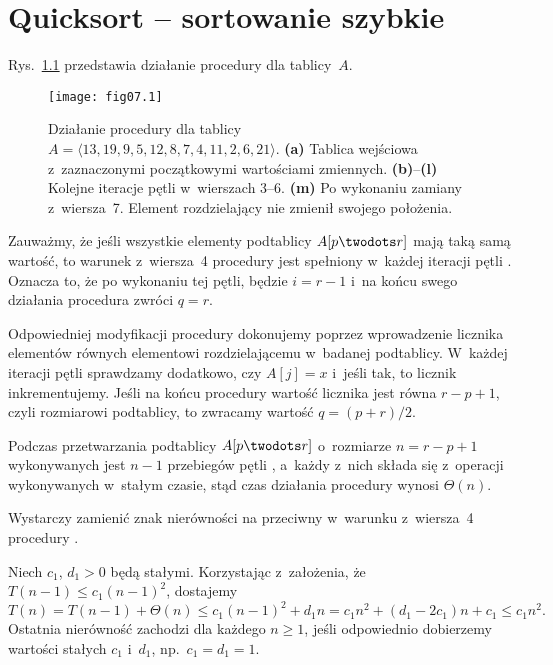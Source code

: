 \chapter{Quicksort -- sortowanie szybkie}


\exercise %
Rys.~\ref{fig:7.1-1} przedstawia działanie procedury  dla tablicy~$A$.
\begin{figure}[ht]
	\begin{center}
		\texttt{[image: fig07.1]}
	\end{center}
	\caption{Działanie procedury  dla tablicy $A=\langle13,19,9,5,12,8,7,4,11,2,6,21\rangle$. {\sffamily\bfseries(a)} Tablica wejściowa z~zaznaczonymi początkowymi wartościami zmiennych. {\sffamily\bfseries(b)}--{\sffamily\bfseries(l)} Kolejne iteracje pętli  w~wierszach 3--6. {\sffamily\bfseries(m)} Po wykonaniu zamiany z~wiersza~7. Element rozdzielający nie zmienił swojego położenia.} \label{fig:7.1-1}
\end{figure}

\exercise %
Zauważmy, że jeśli wszystkie elementy podtablicy $A[p\twodots r]$ mają taką samą wartość, to warunek z~wiersza~4 procedury  jest spełniony w~każdej iteracji pętli . Oznacza to, że po wykonaniu tej pętli, będzie $i=r-1$ i~na końcu swego działania procedura zwróci $q=r$.

Odpowiedniej modyfikacji procedury dokonujemy poprzez wprowadzenie licznika elementów równych elementowi rozdzielającemu w~badanej podtablicy. W~każdej iteracji pętli  sprawdzamy dodatkowo, czy $A[j]=x$ i~jeśli tak, to licznik inkrementujemy. Jeśli na końcu procedury wartość licznika jest równa $r-p+1$, czyli rozmiarowi podtablicy, to zwracamy wartość $q=(p+r)/2$.

\exercise %
Podczas przetwarzania podtablicy $A[p\twodots r]$ o~rozmiarze $n=r-p+1$ wykonywanych jest $n-1$ przebiegów pętli , a~każdy z~nich składa się z~operacji wykonywanych w~stałym czasie, stąd czas działania procedury  wynosi $\Theta(n)$.

\exercise %
Wystarczy zamienić znak nierówności na przeciwny w~warunku z~wiersza~4 procedury .


\exercise %
Niech $c_1$, $d_1>0$ będą stałymi. Korzystając z~założenia, że $T(n-1)\le c_1(n-1)^2$, dostajemy
\[
	T(n) = T(n-1)+\Theta(n) \le c_1(n-1)^2+d_1n = c_1n^2+(d_1-2c_1)n+c_1 \le c_1n^2.
\]
Ostatnia nierówność zachodzi dla każdego $n\ge1$, jeśli odpowiednio dobierzemy wartości stałych $c_1$ i~$d_1$, np.\ $c_1=d_1=1$.

